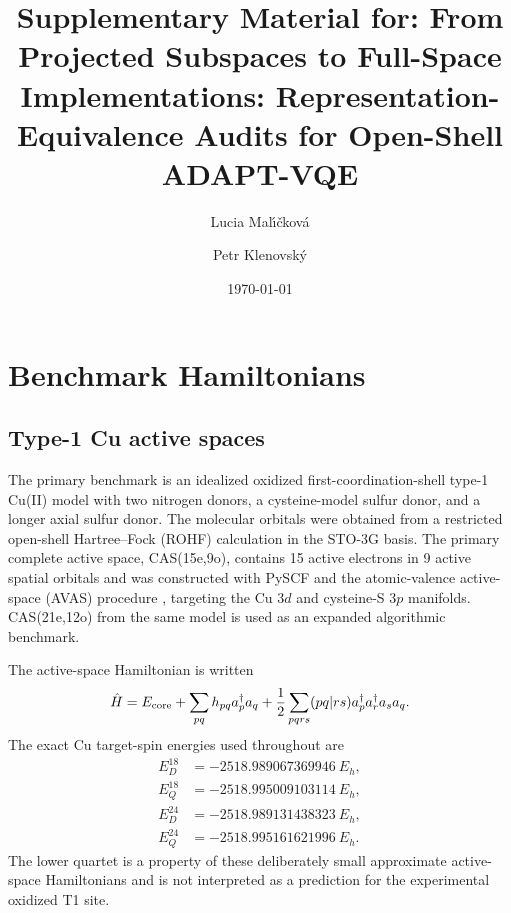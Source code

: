 \documentclass[
 aip,
 jcp,
 amsmath,amssymb,
 preprint
]{revtex4-2}
\begin{document}
\title{Supplementary Material for:
From Projected Subspaces to Full-Space Implementations:
Representation-Equivalence Audits for Open-Shell ADAPT-VQE}

\author{Lucia Mal\'{\i}\v{c}kov\'a}

\author{Petr Klenovsk\'y}

\date{\today}
\maketitle

\section{Benchmark Hamiltonians}

\subsection{Type-1 Cu active spaces}

The primary benchmark is an idealized oxidized first-coordination-shell type-1 Cu(II) model with two nitrogen donors, a cysteine-model sulfur donor, and a longer axial sulfur donor.
The molecular orbitals were obtained from a restricted open-shell Hartree--Fock (ROHF) calculation in the STO-3G basis.
The primary complete active space, CAS(15e,9o), contains 15 active electrons in 9 active spatial orbitals and was constructed with PySCF \cite{sun2018pyscf} and the atomic-valence active-space (AVAS) procedure \cite{sayfutyarova2017avas}, targeting the Cu $3d$ and cysteine-S $3p$ manifolds.
CAS(21e,12o) from the same model is used as an expanded algorithmic benchmark.

The active-space Hamiltonian is written
\begin{equation}
\hat H
=
E_{\rm core}
+\sum_{pq} h_{pq} a_p^\dagger a_q
+\frac{1}{2}\sum_{pqrs}(pq|rs)
a_p^\dagger a_r^\dagger a_s a_q .
\label{eq:H}
\end{equation}
The exact Cu target-spin energies used throughout are
\begin{align}
E_D^{18}&=-2518.989067369946~E_h,\\
E_Q^{18}&=-2518.995009103114~E_h,\\
E_D^{24}&=-2518.989131438323~E_h,\\
E_Q^{24}&=-2518.995161621996~E_h.
\end{align}
The lower quartet is a property of these deliberately small approximate active-space Hamiltonians and is not interpreted as a prediction for the experimental oxidized T1 site.
\end{document}
